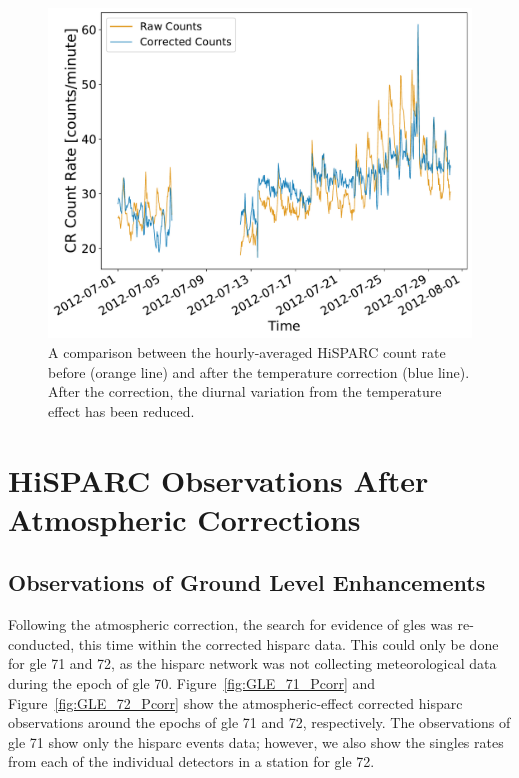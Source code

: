 \begin{figure}[ht]
	\centering
	\includegraphics[width=0.65\columnwidth]{8001_raw_vs_corrected.pdf}
	\caption{A comparison between the hourly-averaged HiSPARC count rate before (orange line) and after the temperature correction (blue line). After the correction, the diurnal variation from the temperature effect has been reduced.}
 	\label{fig:HS_T_corr}
\end{figure}
 

 

\section{HiSPARC Observations After Atmospheric Corrections}\label{sec:HS_obs_Pcorr}


\subsection{Observations of Ground Level Enhancements}

Following the atmospheric correction, the search for evidence of \glspl{gle} was re-conducted, this time within the corrected \gls{hisparc} data. This could only be done for \gls{gle} 71 and 72, as the \gls{hisparc} network was not collecting meteorological data during the epoch of \gls{gle} 70. Figure~\ref{fig:GLE_71_Pcorr} and Figure~\ref{fig:GLE_72_Pcorr} show the atmospheric-effect corrected \gls{hisparc} observations around the epochs of \gls{gle} 71 and 72, respectively. The observations of \gls{gle} 71 show only the \gls{hisparc} events data; however, we also show the singles rates from each of the individual detectors in a station for \gls{gle} 72.

